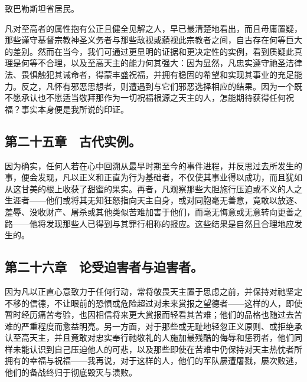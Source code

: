 致巴勒斯坦省居民。\par

凡对至高者的属性抱有公正且健全见解之人，早已最清楚地看出，而且毋庸置疑，那些谨守基督宗教神圣义务者与那些敌视或藐视此宗教者之间，自古存在何等巨大的差别。然而在当今，我们可通过更显明的证据和更决定性的实例，看到质疑此真理是何等不合理，以及至高天主的能力何其强大：因为显然，凡忠实遵守祂圣洁律法、畏惧触犯其诫命者，得蒙丰盛祝福，并拥有稳固的希望和实现其事业的充足能力。反之，凡怀有邪恶思想者，则遭遇到与它们邪恶选择相应的结果。因为一个既不愿承认也不愿适当敬拜那作为一切祝福根源之天主的人，怎能期待获得任何祝福？事实本身便是我所说的印证。\par


\subsection{第二十五章　古代实例。}

因为确实，任何人若在心中回溯从最早时期至今的事件进程，并反思过去所发生的事，便会发现，凡以正义和正直为行为基础者，不仅使其事业得以成功，而且犹如从这甘美的根上收获了甜蜜的果实。再者，凡观察那些大胆施行压迫或不义的人之生涯者——他们或将其无知狂怒指向天主自身，或对同胞毫无善意，竟敢以放逐、羞辱、没收财产、屠杀或其他类似苦难加害于他们，而毫无悔意或无意转向更善之路——他将发现那些人已得到与其罪行相称的报应。这些结果是自然且合理地应发生的。\par


\subsection{第二十六章　论受迫害者与迫害者。}

因为凡以正直心意致力于任何行动，常将敬畏天主置于思虑之前，并保持对祂坚定不移的信德，不让眼前的恐惧或危险超过对未来赏报之望德者——这样的人，即使暂时经历痛苦考验，也因相信将来更大赏报而轻看其苦难；他们的品格也随过去苦难的严重程度而愈益明亮。另一方面，对于那些或无耻地轻忽正义原则、或拒绝承认至高天主，并且竟敢对忠实奉行祂敬礼的人施加最残酷的侮辱和惩罚者，他们同样未能认识到自己压迫他人的可悲，以及那些即使在苦难中仍保持对天主热忱者所拥有的幸福与祝福——我再说，对于这样的人，他们的军队屡遭屠戮，屡次败逃，他们的备战终归于彻底毁灭与溃败。\par

